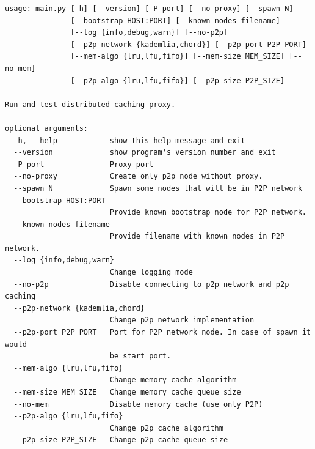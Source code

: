 \documentclass[a4paper,11pt]{scrartcl}
\begin{document}
\begin{lstlisting}[label=lst_main_help, caption={Dostępne opcje konfiguracyjne głównej aplikacji.}]
usage: main.py [-h] [--version] [-P port] [--no-proxy] [--spawn N]
               [--bootstrap HOST:PORT] [--known-nodes filename]
               [--log {info,debug,warn}] [--no-p2p]
               [--p2p-network {kademlia,chord}] [--p2p-port P2P PORT]
               [--mem-algo {lru,lfu,fifo}] [--mem-size MEM_SIZE] [--no-mem]
               [--p2p-algo {lru,lfu,fifo}] [--p2p-size P2P_SIZE]

Run and test distributed caching proxy.

optional arguments:
  -h, --help            show this help message and exit
  --version             show program's version number and exit
  -P port               Proxy port
  --no-proxy            Create only p2p node without proxy.
  --spawn N             Spawn some nodes that will be in P2P network
  --bootstrap HOST:PORT
                        Provide known bootstrap node for P2P network.
  --known-nodes filename
                        Provide filename with known nodes in P2P network.
  --log {info,debug,warn}
                        Change logging mode
  --no-p2p              Disable connecting to p2p network and p2p caching
  --p2p-network {kademlia,chord}
                        Change p2p network implementation
  --p2p-port P2P PORT   Port for P2P network node. In case of spawn it would
                        be start port.
  --mem-algo {lru,lfu,fifo}
                        Change memory cache algorithm
  --mem-size MEM_SIZE   Change memory cache queue size
  --no-mem              Disable memory cache (use only P2P)
  --p2p-algo {lru,lfu,fifo}
                        Change p2p cache algorithm
  --p2p-size P2P_SIZE   Change p2p cache queue size
\end{lstlisting}




\end{document}
